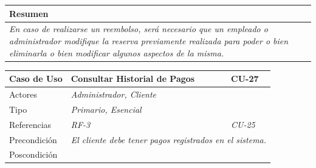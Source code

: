 \begin{table}[H]
\begin{tabular}{|llllllll|}
    \multicolumn{8}{|l|}{\cellcolor[HTML]{F2F2F2}Resumen}                                                                                                                                                                            \\ \hline
    \multicolumn{8}{|p{15cm}|}{{\color[HTML]{808080} \textit{En caso de realizarse un reembolso, será necesario que un empleado o administrador modifique la reserva previamente realizada para poder o bien eliminarla o bien modificar algunos aspectos de la misma.}}} \\ \hline
    \end{tabular}
\end{table}




\begin{table}[H]
    \begin{tabular}{|llllllll|}
    \hline
    \multicolumn{1}{|l|}{Caso de Uso}       & \multicolumn{5}{l|}{Consultar Historial de Pagos}                                                                          & \multicolumn{2}{l|}{\cellcolor[HTML]{E6E6E6}CU-27}          \\ \hline
    \multicolumn{1}{|l|}{Actores}           & \multicolumn{7}{l|}{{\color[HTML]{808080} \textit{Administrador, Cliente}}}                                                                                                                           \\ \hline
    \multicolumn{1}{|l|}{Tipo}              & \multicolumn{7}{l|}{{\color[HTML]{808080} \textit{Primario, Esencial}}}                                                                                                                \\ \hline
    \multicolumn{1}{|l|}{Referencias}       & \multicolumn{2}{l|}{{\color[HTML]{808080} \textit{RF-3}}}              & \multicolumn{5}{l|}{{\color[HTML]{808080} \textit{CU-25}}}                                                                                       \\ \hline
    \multicolumn{1}{|l|}{Precondición}      & \multicolumn{7}{l|}{{\color[HTML]{808080} \textit{El cliente debe tener pagos registrados en el sistema.}}}                                                                                                \\ \hline
    \multicolumn{1}{|l|}{Poscondición}      & \multicolumn{7}{l|}{}                                                                                                                                                                  \\ \hline

\end{tabular}
\end{table}
